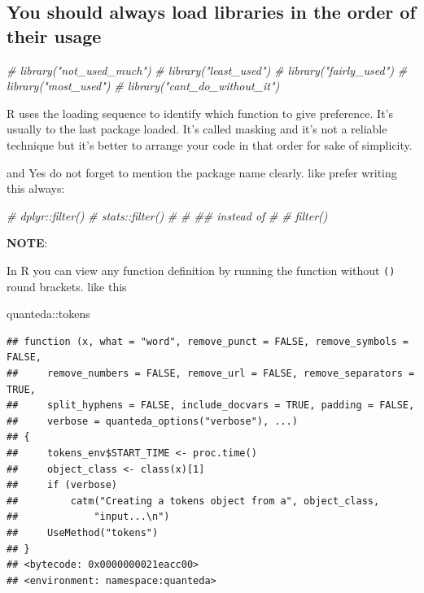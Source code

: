 \documentclass[
]{book}
\newenvironment{Shaded}{\begin{snugshade}}{\end{snugshade}}
\newcommand{\CommentTok}[1]{\textcolor[rgb]{0.56,0.35,0.01}{\textit{#1}}}
\newcommand{\NormalTok}[1]{#1}
\newcommand{\SpecialCharTok}[1]{\textcolor[rgb]{0.00,0.00,0.00}{#1}}
\begin{document}
\hypertarget{you-should-always-load-libraries-in-the-order-of-their-usage}{%
\subsection{You should always load libraries in the order of their usage}\label{you-should-always-load-libraries-in-the-order-of-their-usage}}

\begin{Shaded}
\begin{Highlighting}[]
\CommentTok{\# library("not\_used\_much")}
\CommentTok{\# library("least\_used")}
\CommentTok{\# library("fairly\_used")}
\CommentTok{\# library("most\_used")}
\CommentTok{\# library("cant\_do\_without\_it")}
\end{Highlighting}
\end{Shaded}

R uses the loading sequence to identify which function to give preference. It's usually to the last package loaded. It's called masking and it's not a reliable technique but it's better to arrange your code in that order for sake of simplicity.

and Yes do not forget to mention the package name clearly. like prefer writing this always:

\begin{Shaded}
\begin{Highlighting}[]
\CommentTok{\# dplyr::filter()}
\CommentTok{\# stats::filter()}
\CommentTok{\# }
\CommentTok{\# \#\# instead of }
\CommentTok{\# }
\CommentTok{\# filter()}
\end{Highlighting}
\end{Shaded}

\textbf{NOTE}:

In R you can view any function definition by running the function without \texttt{()} round brackets. like this

\begin{Shaded}
\begin{Highlighting}[]
\NormalTok{quanteda}\SpecialCharTok{::}\NormalTok{tokens}
\end{Highlighting}
\end{Shaded}

\begin{verbatim}
## function (x, what = "word", remove_punct = FALSE, remove_symbols = FALSE, 
##     remove_numbers = FALSE, remove_url = FALSE, remove_separators = TRUE, 
##     split_hyphens = FALSE, include_docvars = TRUE, padding = FALSE, 
##     verbose = quanteda_options("verbose"), ...) 
## {
##     tokens_env$START_TIME <- proc.time()
##     object_class <- class(x)[1]
##     if (verbose) 
##         catm("Creating a tokens object from a", object_class, 
##             "input...\n")
##     UseMethod("tokens")
## }
## <bytecode: 0x0000000021eacc00>
## <environment: namespace:quanteda>
\end{verbatim}
\end{document}
